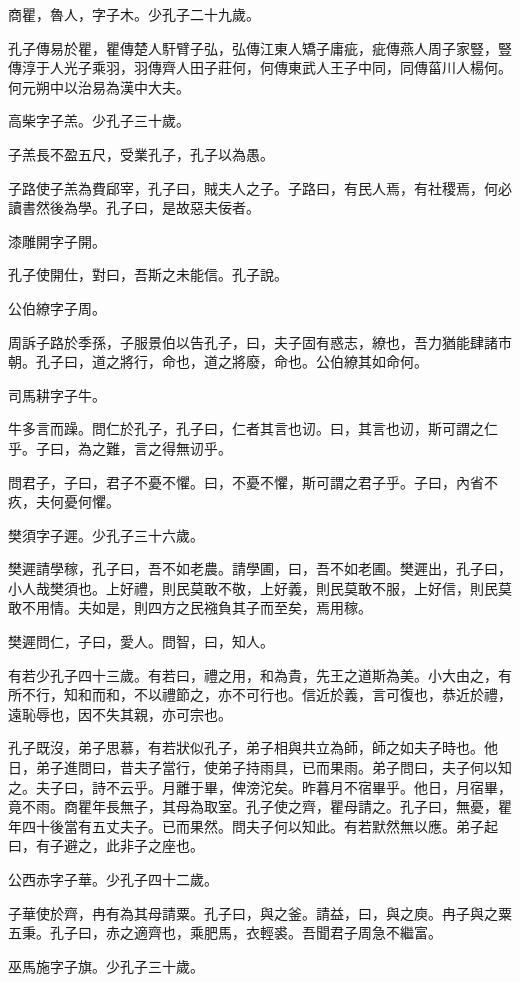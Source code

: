 商瞿，魯人，字子木。少孔子二十九歲。

孔子傳易於瞿，瞿傳楚人馯臂子弘，弘傳江東人矯子庸疵，疵傳燕人周子家豎，豎傳淳于人光子乘羽，羽傳齊人田子莊何，何傳東武人王子中同，同傳菑川人楊何。何元朔中以治易為漢中大夫。

高柴字子羔。少孔子三十歲。

子羔長不盈五尺，受業孔子，孔子以為愚。

子路使子羔為費郈宰，孔子曰，賊夫人之子。子路曰，有民人焉，有社稷焉，何必讀書然後為學。孔子曰，是故惡夫佞者。

漆雕開字子開。

孔子使開仕，對曰，吾斯之未能信。孔子說。

公伯繚字子周。

周訴子路於季孫，子服景伯以告孔子，曰，夫子固有惑志，繚也，吾力猶能肆諸市朝。孔子曰，道之將行，命也，道之將廢，命也。公伯繚其如命何。

司馬耕字子牛。

牛多言而躁。問仁於孔子，孔子曰，仁者其言也讱。曰，其言也讱，斯可謂之仁乎。子曰，為之難，言之得無讱乎。

問君子，子曰，君子不憂不懼。曰，不憂不懼，斯可謂之君子乎。子曰，內省不疚，夫何憂何懼。

樊須字子遲。少孔子三十六歲。

樊遲請學稼，孔子曰，吾不如老農。請學圃，曰，吾不如老圃。樊遲出，孔子曰，小人哉樊須也。上好禮，則民莫敢不敬，上好義，則民莫敢不服，上好信，則民莫敢不用情。夫如是，則四方之民襁負其子而至矣，焉用稼。

樊遲問仁，子曰，愛人。問智，曰，知人。

有若少孔子四十三歲。有若曰，禮之用，和為貴，先王之道斯為美。小大由之，有所不行，知和而和，不以禮節之，亦不可行也。信近於義，言可復也，恭近於禮，遠恥辱也，因不失其親，亦可宗也。

孔子既沒，弟子思慕，有若狀似孔子，弟子相與共立為師，師之如夫子時也。他日，弟子進問曰，昔夫子當行，使弟子持雨具，已而果雨。弟子問曰，夫子何以知之。夫子曰，詩不云乎。月離于畢，俾滂沱矣。昨暮月不宿畢乎。他日，月宿畢，竟不雨。商瞿年長無子，其母為取室。孔子使之齊，瞿母請之。孔子曰，無憂，瞿年四十後當有五丈夫子。已而果然。問夫子何以知此。有若默然無以應。弟子起曰，有子避之，此非子之座也。

公西赤字子華。少孔子四十二歲。

子華使於齊，冉有為其母請粟。孔子曰，與之釜。請益，曰，與之庾。冉子與之粟五秉。孔子曰，赤之適齊也，乘肥馬，衣輕裘。吾聞君子周急不繼富。

巫馬施字子旗。少孔子三十歲。

